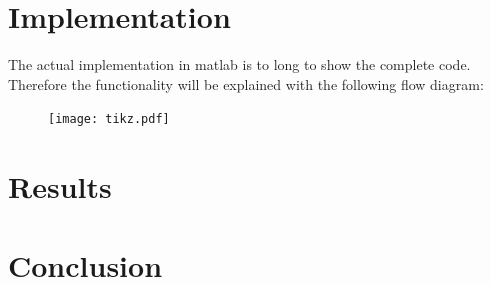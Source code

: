 \documentclass[12pt]{scrartcl}
\begin{document}
\section{Implementation}
\label{seq:impl}
The actual implementation in matlab is to long to show the complete code. Therefore the functionality will be explained with the following flow diagram:

\begin{figure}
\texttt{[image: tikz.pdf]}
\end{figure}

\section{Results}
\section{Conclusion}

\nocite{vargas2013tearing}
\nocite{gerya2009introduction}




\newpage



\end{document}
